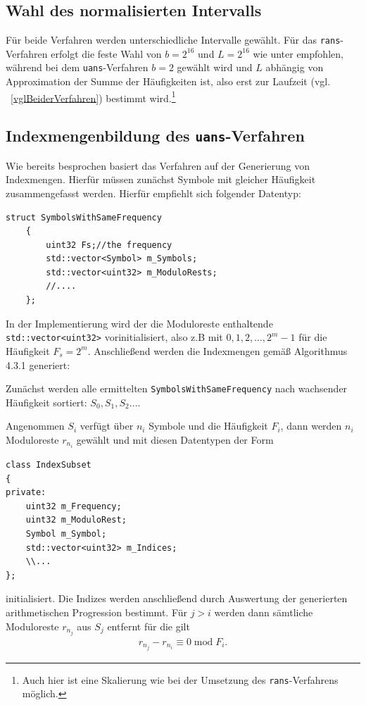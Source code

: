 \documentclass[a4paper,12pt]{article}
\newcounter{Algorithmus}
\begin{document}
\subsection{Wahl des normalisierten Intervalls}
Für beide Verfahren werden unterschiedliche Intervalle gewählt. Für das {\tt{rans}}-Verfahren erfolgt die feste Wahl von $b= 2^{16}$ und $L=2^{16}$ wie unter \cite{Duda1} empfohlen, während bei dem {\tt{uans}}-Verfahren $b=2$ gewählt wird und $L$ abhängig von Approximation der Summe der Häufigkeiten ist, also erst zur Laufzeit (vgl. ~\ref{vglBeiderVerfahren}) bestimmt wird.\footnote{Auch hier ist eine Skalierung wie bei der Umsetzung des {\tt{rans}}-Verfahrens möglich.} 

\subsection{Indexmengenbildung des {\tt{uans}}-Verfahren}
Wie bereits besprochen basiert das Verfahren auf der Generierung von 
Indexmengen. Hierfür müssen zunächst Symbole mit gleicher Häufigkeit 
zusammengefasst werden. Hierfür empfiehlt sich folgender Datentyp:

\begin{verbatim}
struct SymbolsWithSameFrequency
	{
		uint32 Fs;//the frequency
		std::vector<Symbol> m_Symbols;
		std::vector<uint32> m_ModuloRests;
		//....
	};
\end{verbatim}

In der Implementierung wird der die Moduloreste enthaltende {\tt{std::vector<uint32>}} vorinitialisiert, also z.B mit $0,1,2,\ldots,2^{m}-1$ für die 
Häufigkeit $F_{s}=2^m$.
Anschließend werden die Indexmengen gemäß Algorithmus 4.3.1 generiert: 
\par
Zunächst werden alle ermittelten {\tt{SymbolsWithSameFrequency}}  nach 
wachsender Häufigkeit sortiert: $S_{0},S_{1},S_{2}\ldots$.
\par
Angenommen $S_{i}$ 
verfügt über $n_{i}$ Symbole und die Häufigkeit $F_{i}$, dann werden $n_{i}$ 
Moduloreste $r_{n_{i}}$ gewählt und mit diesen Datentypen der Form
\begin{verbatim}
class IndexSubset
{
private:
	uint32 m_Frequency;
	uint32 m_ModuloRest;
	Symbol m_Symbol;
	std::vector<uint32> m_Indices;
	\\...
};
\end{verbatim} 

initialisiert. Die Indizes werden anschließend durch Auswertung der generierten 
arithmetischen Progression bestimmt. 
Für $j> i$ werden dann sämtliche Moduloreste  $r_{n_{j}}$ aus $S_{j}$ 
entfernt für die gilt 
\begin{align*}
r_{n_{j}} - r_{n_{i}} \equiv 0\;\text{mod}\;F_{i}.
\end{align*}
\end{document}

